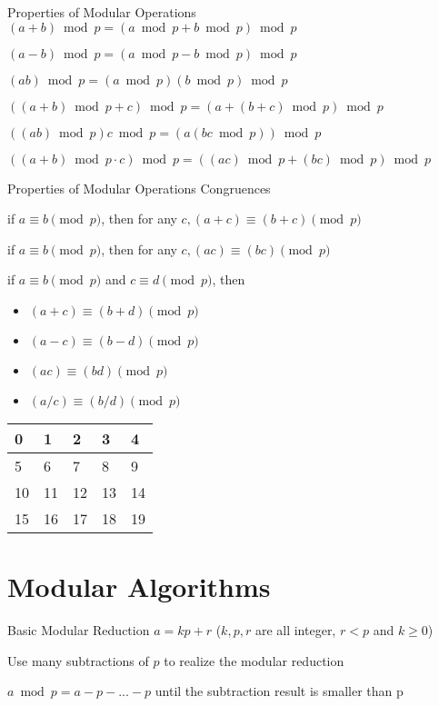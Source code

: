 \documentclass{beamer}
\begin{document}
\begin{frame}{Properties of Modular Operations}	
$(a + b) \bmod p = (a \bmod p + b \bmod p) \bmod p$

$(a - b) \bmod p = (a \bmod p - b \bmod p) \bmod p$

$(a  b) \bmod p = (a \bmod p)   (b \bmod p) \bmod p$

$((a + b) \bmod p + c) \bmod p = (a + (b + c) \bmod p) \bmod p$

	$((a  b) \bmod p)  c \bmod p = (a  (b  c \bmod p)) \bmod p$

	$((a +b) \bmod p \cdot c) \bmod p = ((a  c) \bmod p + (b  c) \bmod p) \bmod p $
\end{frame}

\begin{frame}{Properties of Modular Operations}	
	\alert{Congruences}

	if $a \equiv b \pmod p$, then for any $c, (a + c) \equiv (b + c) \pmod p$
	
	if $a \equiv b \pmod p$, then for any $c, (a  c) \equiv (b  c) \pmod p$
	
	if $a \equiv b \pmod p$ and $c \equiv d \pmod p$, then  
		\begin{itemize}
			\item	$(a + c) \equiv (b + d) \pmod p$
			\item	$(a - c) \equiv (b - d) \pmod p$
			\item   $(a  c) \equiv (b  d) \pmod p$
			\item   $(a / c) \equiv (b / d) \pmod p$
		\end{itemize}
	
		\begin{table}[]
\begin{tabular}{|l|l|l|l|l|}
\hline
0  & 1  & 2  & 3  & 4  \\ \hline
5  & 6  & 7  & 8  & 9  \\ \hline
10 & 11 & 12 & 13 & 14 \\ \hline
15 & 16 & 17 & 18 & 19 \\ \hline
\end{tabular}
\end{table}
\end{frame}

\section{Modular Algorithms}
\begin{frame}{Basic Modular Reduction}
$a = kp + r$ ($k,p,r$ are all integer, $r < p$ and $k \geq 0$)

	Use many \alert{subtractions} of $p$ to realize the modular reduction

	\hspace*{\fill}

	$a \bmod p = a - p - ... - p$ until the subtraction result is smaller than p
\end{frame}
\end{document}
